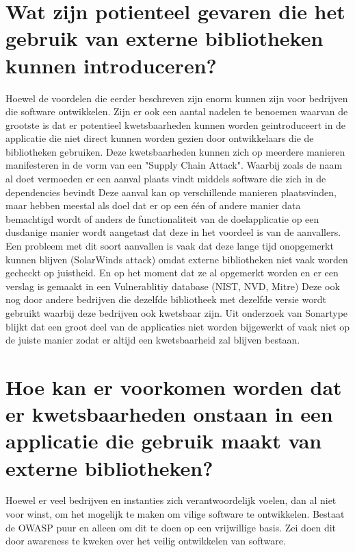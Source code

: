 \section{Wat zijn potienteel gevaren die het gebruik van externe bibliotheken kunnen introduceren?}\label{sec:wat-zijn-potienteel-gevaren-die-het-gebruik-van-externe-bibliotheken-kunnen-introduceren?}
Hoewel de voordelen die eerder beschreven zijn enorm kunnen zijn voor bedrijven die software ontwikkelen. Zijn er ook een aantal nadelen te benoemen waarvan de grootste is dat er potentieel kwetsbaarheden kunnen worden geintroduceert in de applicatie die niet direct kunnen worden gezien door ontwikkelaars die de bibliotheken gebruiken. Deze kwetsbaarheden kunnen zich op meerdere manieren manifesteren in de vorm van een "Supply Chain Attack". Waarbij zoals de naam al doet vermoeden er een aanval plaats vindt middels software die zich in de dependencies bevindt Deze aanval kan op verschillende manieren plaatsvinden, maar hebben meestal als doel dat er op een één of andere manier data bemachtigd wordt of anders de functionaliteit van de doelapplicatie op een dusdanige manier wordt aangetast dat deze in het voordeel is van de aanvallers. Een probleem met dit soort aanvallen is vaak dat deze lange tijd onopgemerkt kunnen blijven (SolarWinds attack) omdat externe bibliotheken niet vaak worden gecheckt op juistheid. En op het moment dat ze al opgemerkt worden en er een verslag is gemaakt in een Vulnerablitiy database (NIST, NVD, Mitre) Deze ook nog door andere bedrijven die dezelfde bibliotheek met dezelfde versie wordt gebruikt waarbij deze bedrijven ook kwetsbaar zijn. Uit onderzoek van Sonartype blijkt dat een groot deel van de applicaties niet worden bijgewerkt of vaak niet op de juiste manier zodat er altijd een kwetsbaarheid zal blijven bestaan.

\section{Hoe kan er voorkomen worden dat er kwetsbaarheden onstaan in een applicatie die gebruik maakt van externe bibliotheken?}\label{sec:hoe-kan-er-voorkomen-worden-dat-er-kkwetsbaarheden-onstaan-in-een-applicatie-die-gebruik-maakt-van-externe-bibliotheken?}
Hoewel er veel bedrijven en instanties zich verantwoordelijk voelen, dan al niet voor winst, om het mogelijk te maken om vilige software te ontwikkelen. Bestaat de OWASP puur en alleen om dit te doen op een vrijwillige basis. Zei doen dit door awareness te kweken over het veilig ontwikkelen van software.

